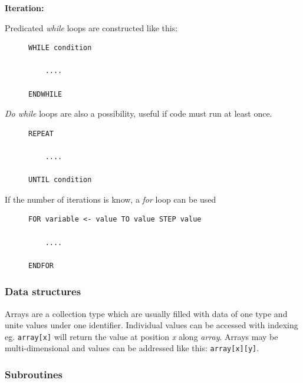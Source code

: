 \documentclass[9pt]{article}
\begin{document}
\textbf{Iteration:}

Predicated \emph{while} loops are constructed like this:

\begin{figure}[H]
\begin{verbatim}
WHILE condition

    ....

ENDWHILE
\end{verbatim}
\end{figure}

\emph{Do while} loops are also a possibility, useful if code must run at least once.

\begin{figure}[H]
\begin{verbatim}
REPEAT

    ....

UNTIL condition
\end{verbatim}
\end{figure}

If the number of iterations is know, a \emph{for} loop can be used

\begin{figure}[H]
\begin{verbatim}
FOR variable <- value TO value STEP value

    ....

ENDFOR
\end{verbatim}
\end{figure}

\subsubsection{Data structures}
\label{sec:orgf5f5c7e}

Arrays are a collection type which are usually filled with data of one type and unite values under one identifier. Individual values can be accessed with indexing eg. \texttt{array[x]} will return the value at position \emph{x} along \emph{array}. Arrays may be multi-dimensional and values can be addressed like this: \texttt{array[x][y]}.

\subsubsection{Subroutines}
\label{sec:org2c4d115}
\end{document}
